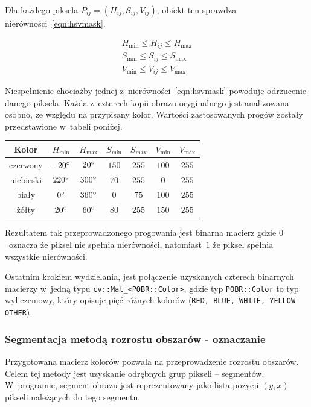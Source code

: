 Dla każdego piksela $P_{ij} = (H_{ij}, S_{ij}, V_{ij})$, obiekt ten sprawdza  nierówności~\ref{eqn:hsvmask}.

\begin{equation}
    \begin{aligned}
        H_{\mathrm{min}} \leq H_{ij} \leq H_{\mathrm{max}} \\
        S_{\mathrm{min}} \leq S_{ij} \leq S_{\mathrm{max}} \\
        V_{\mathrm{min}} \leq V_{ij} \leq V_{\mathrm{max}}
    \end{aligned}
    \label{eqn:hsvmask}
\end{equation}

Niespełnienie chociażby jednej z~nierówności~\ref{eqn:hsvmask} powoduje odrzucenie danego piksela. Każda z~czterech kopii obrazu oryginalnego jest analizowana osobno, ze względu na przypisany kolor. Wartości zastosowanych progów zostały przedstawione w~tabeli poniżej.

\begin{center}
\begin{tabular}{c|c|c|c|c|c|c}
    Kolor & $H_{\mathrm{min}}$ & $H_{\mathrm{max}}$ & $S_{\mathrm{min}}$ & $S_{\mathrm{max}}$ & $V_{\mathrm{min}}$ & $V_{\mathrm{max}}$ \\ \hline 
    czerwony & $-20\degree$ & $20\degree$ & $150$ & $255$ & $100$ & $255$ \\ \hline
    niebieski & $ 220\degree$ & $300\degree$ & $70$ & $255$ & $0$ & $255$ \\ \hline
    biały & $0\degree$ & $360\degree$ & $0$ & $75$ & $100$ & $255$ \\ \hline
    żółty & $20\degree$ & $60\degree$ & $80$ & $255$ & $150$ & $255$ 
\end{tabular}
\end{center}

Rezultatem tak przeprowadzonego progowania jest binarna macierz gdzie $0$~oznacza że piksel nie spełnia nierówności, natomiast~$1$ że piksel spełnia wszystkie nierówności. 

Ostatnim krokiem wydzielania, jest połączenie uzyskanych czterech binarnych macierzy w~jedną typu \texttt{cv::Mat\_{}<POBR::Color>}, gdzie typ \texttt{POBR::Color} to typ wyliczeniowy, który opisuje pięć różnych kolorów (\texttt{RED, BLUE, WHITE, YELLOW OTHER}). 

\subsubsection{Segmentacja metodą rozrostu obszarów - oznaczanie}
Przygotowana macierz kolorów pozwala na przeprowadzenie rozrostu obszarów. Celem tej metody jest uzyskanie odrębnych grup pikseli -- segmentów. W~programie, segment obrazu jest reprezentowany jako lista pozycji $(y, x)$ pikseli należących do tego segmentu.

